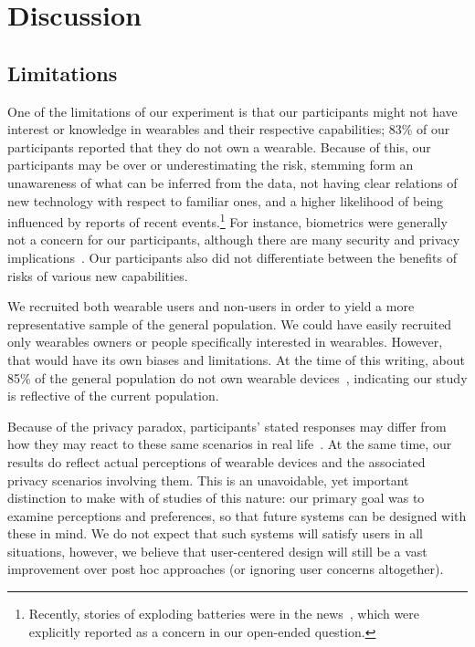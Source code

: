 
\section{Discussion}

\subsection{Limitations}
One of the limitations of our experiment is that our participants might not have interest or knowledge in wearables and their respective capabilities; 83\% of our participants reported that they do not own a wearable. Because of this, our participants may be over or underestimating the risk, stemming form an unawareness of what can be inferred from the data, not having clear relations of new technology with respect to familiar ones, and a higher likelihood of being influenced by reports of recent events.\footnote{Recently, stories of exploding batteries were in the news~\cite{1_levin_2014}, which were explicitly reported as a concern in our open-ended question.}  For instance, biometrics were generally not a concern for our participants, although there are many security and privacy implications~\cite{prabhakar2003biometric}. Our participants also did not differentiate between the benefits of risks of various new capabilities.

We recruited both wearable users and non-users in order to yield a more representative sample of the general population. We could have easily recruited only wearables owners or people specifically interested in wearables. However, that would have its own biases and limitations. At the time of this writing, about 85\% of the general population do not own wearable devices~\cite{Nilsen,WearableStatNews}, indicating our study is reflective of the current population. 

Because of the privacy paradox, participants' stated responses may differ from how they may react to these same scenarios in real life~\cite{norberg2007privacy, jensen2005privacy}. At the same time, our results do reflect actual perceptions of wearable devices and the associated privacy scenarios involving them. This is an unavoidable, yet important distinction to make with of studies of this nature: our primary goal was to examine perceptions and preferences, so that future systems can be designed with these in mind. We do not expect that such systems will satisfy users in all situations, however, we believe that user-centered design will still be a vast improvement over post hoc approaches (or ignoring user concerns altogether).

